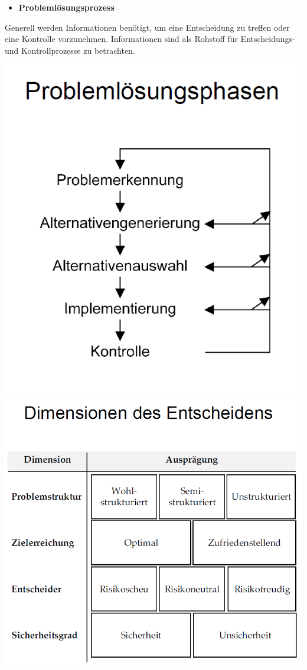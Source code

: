 \documentclass[]{article}
\providecommand{\tightlist}{%
  \setlength{\itemsep}{0pt}\setlength{\parskip}{0pt}}
\begin{document}
\begin{itemize}
\tightlist
\item
  \textbf{Problemlösungsprozess}
\end{itemize}

Generell werden Informationen benötigt, um eine Entscheidung zu treffen
oder eine Kontrolle vorzunehmen. Informationen sind als Rohstoff für
Entscheidungs- und Kontrollprozesse zu betrachten.

\includegraphics{img/problophasen.png}
\includegraphics{img/dimensionentscheiden.png}
\end{document}
